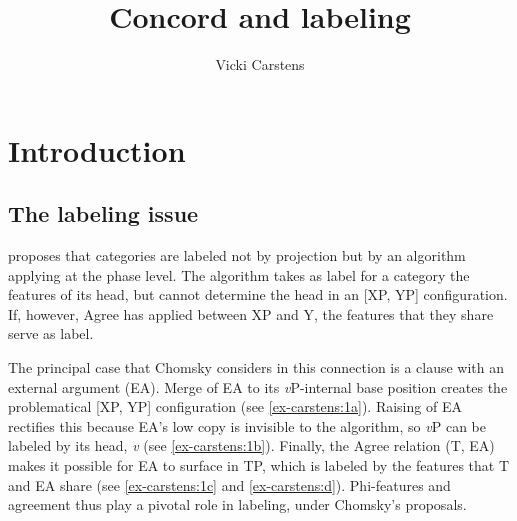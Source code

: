 \documentclass[output=paper
,modfonts
,nonflat]{langsci/langscibook}
\title{Concord and labeling}
\author{Vicki Carstens\affiliation{Southern Illinois University}}
\begin{document}
	\maketitle
\section{Introduction} \label{sec-carstens:1}
\subsection{The labeling issue} \label{sec-carstens:1.1}
\citet{Chomsky2013, Chomsky2015} proposes that categories are labeled not by projection but by an algorithm applying at the phase level. The algorithm takes as label for a category the features of its head, but cannot determine the head in an [XP, YP] configuration. If, however, Agree has applied between XP and Y, the features that they share serve as label. 

The principal case that Chomsky considers in this connection is a clause with an external argument (EA). Merge of EA to its \textit{v}P-internal base position creates the problematical [XP, YP] configuration (see \ref{ex-carstens:1a}). Raising of EA rectifies this because EA’s low copy is invisible to the algorithm, so \textit{v}P can be labeled by its head, \textit{v} (see \ref{ex-carstens:1b}). Finally, the Agree relation (T, EA) makes it possible for EA to surface in TP, which is labeled by the features that T and EA share (see \ref{ex-carstens:1c} and \ref{ex-carstens:d}). Phi-features and agreement thus play a pivotal role in labeling, under Chomsky's proposals. 
\end{document}
